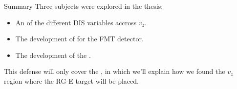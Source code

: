 \documentclass[aspectratio=169]{beamer}
\begin{document}

    \begin{frame}
        \titlepage
    \end{frame}

    \begin{frame}{Summary}
        Three subjects were explored in the thesis:

        \vspace{12pt}

        \begin{itemize}
            \item
                An  of the different DIS variables accross $v_z$.

            \vspace{6pt}
            \item
                The development of  for the FMT detector.

            \vspace{6pt}
            \item
                The development of the .
        \end{itemize}

        \vspace{12pt}

        This defense will only cover the , in which we'll explain how we found the $v_z$ region where the RG-E target will be placed.
    \end{frame}

    \tableofcontents \pagebreak



    \addtocounter{framenumber}{-1}
    \graphicspath{{10context/img}}
    

    \graphicspath{{11data_analysis/img}}
    

    \graphicspath{{12study_results/img}}
    

    \graphicspath{{20backup/img}}
    
\end{document}
